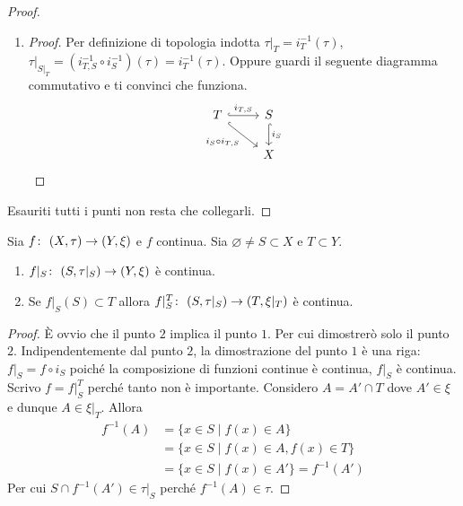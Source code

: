 \begin{proof}
\begin{enumerate}
\begin{proof}
		Dimostro $ \bar{W}^\tau \cap S\subset \bar{W}^{\tau|_S}$. Per il punto $2$ esiste un chiuso $C$ di $\tau$ tale che $C \cap S = \bar{W}^{\tau|_S}$. Per cui $W \subset C$ e per l'ipotesi di minimalità della chiusura ho anche che $\bar{W}^\tau \subset C$, e segue $\bar{W}^\tau \cap S \subset C \cap S = \bar{W}^{\tau|_S}$.
	\end{proof}
	\item 
	\begin{proof}
		Per definizione di topologia indotta $\tau|_T = i^{-1}_T(\tau)$, $\tau|_{S|_T} = (i^{-1}_{T,S} \circ i^{-1}_{S}) (\tau) = i^{-1}_T(\tau)$. Oppure guardi il seguente diagramma commutativo e ti convinci che funziona.
		\begin{equation}
		\begin{tikzcd}
				T \arrow[hook]{r}{i_{T,S}} \arrow[hook,swap]{rd}{i_{S} \circ i_{T,S}} & S \arrow[hook]{d}{i_S} \\
																							 & X
		\end{tikzcd}
		\end{equation}	
	\end{proof}
\end{enumerate}
Esauriti tutti i punti non resta che collegarli.
\end{proof}


\begin{theorem}
	Sia $f \colon\ (X,\tau) \rightarrow (Y,\xi)$ e $f$ continua. Sia $\varnothing \neq S \subset X$ e $T \subset Y$.
	\begin{enumerate}
		\item $f|_S \colon\ (S, \tau|_S) \rightarrow (Y, \xi)$ è continua.
		\item Se $f|_S(S) \subset T$ allora $f|^T_S \colon\ (S, \tau|_S) \rightarrow (T, \xi|_T)$ è continua.
	\end{enumerate}
\end{theorem}
\begin{proof}
	È ovvio che il punto $2$ implica il punto $1$. Per cui dimostrerò solo il punto $2$. Indipendentemente dal punto $2$, la dimostrazione del punto $1$ è una riga: $f|_S = f \circ i_S$ poiché la composizione di funzioni continue è continua, $f|_S$ è continua.\\
	
	Scrivo $f = f|^T_S$ perché tanto non è importante. Considero $A = A' \cap T$ dove $A' \in \xi$ e dunque $A \in \xi|_T$. Allora 
	\begin{equation}
	\begin{aligned}
		f^{-1}(A) & = \{x \in  S \; | \; f(x) \in A \} \\
					  & = \{x \in  S \; | \; f(x) \in A , f(x) \in T \} \\
					  & =  \{x \in  S \; | \; f(x) \in A'\} = f^{-1}(A')
	\end{aligned}
	\end{equation}
	Per cui $S \cap f^{-1}(A') \in \tau|_S$ perché $f^{-1}(A) \in \tau$.
\end{proof}

